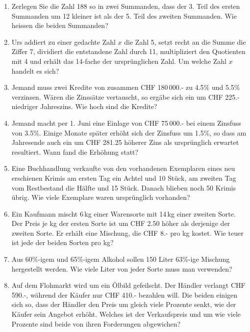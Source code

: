 \begin{enumerate}
\item
  Zerlegen Sie die Zahl 188 so in zwei Summanden, dass der 3. Teil des
  ersten Summanden um 12 kleiner ist als der 5. Teil des zweiten
  Summanden. Wie heissen die beiden Summanden?

\item Urs addiert zu einer gedachte Zahl $x$ die Zahl 5, setzt recht
  an die Summe die Ziffer 7, dividiert die entstandene Zahl durch 11,
  multipliziert den Quotienten mit 4 und erhält das 14-fache der
  ursprünglichen Zahl. Um welche Zahl $x$ handelt es sich?

\item Jemand muss zwei Kredite von zusammen CHF 180\,000.- zu 4.5\%
  und 5.5\% verzinsen. Wären die Zinssätze vertauscht, so ergäbe sich
  ein um CHF 225.- niedriger Jahreszins. Wie hoch sind die Kredite?

\item Jemand macht per 1. Juni eine Einlage von CHF 75\,000.- bei
  einem Zinsfuss von 3.5\%. Einige Monate später erhöht sich der
  Zinsfuss um 1.5\%, so dass am Jahresende auch ein um CHF 281.25
  höherer Zins als ursprünglich erwartet resultiert. Wann fand die
  Erhöhung statt?

\item Eine Buchhandlung verkaufte von den vorhandenen Exemplaren eines
  neu erschienen Krimis am ersten Tag ein Achtel und 10 Stück, am
  zweiten Tag vom Restbestand die Hälfte und 15 Stück. Danach blieben
  noch 50 Krimis übrig. Wie viele Exemplare waren ursprünglich
  vorhanden?

\item Ein Kaufmann mischt 6\,kg einer Warensorte mit 14\,kg einer
  zweiten Sorte. Der Preis je kg der ersten Sorte ist um CHF 2.50
  höher als derjenige der zweiten Sorte. Er erhält eine Mischung, die
  CHF 8.- pro kg kostet. Wie teuer ist jede der beiden Sorten pro kg?

\item Aus 60\%-igem und 65\%-igem Alkohol sollen 150 Liter 63\%-ige
  Mischung hergestellt werden. Wie viele Liter von jeder Sorte muss
  man verwenden?

\item Auf dem Flohmarkt wird um ein Ölbild gefeilscht. Der Händler
  verlangt CHF 590.-, während der Käufer nur CHF 410.- bezahlen
  will. Die beiden einigen sich so, dass der Händler den Preis um
  gleich viele Prozente senkt, wie der Käufer sein Angebot
  erhöht. Welches ist der Verkaufspreis und um wie viele Prozente sind
  beide von ihren Forderungen abgewichen?


\end{enumerate}
